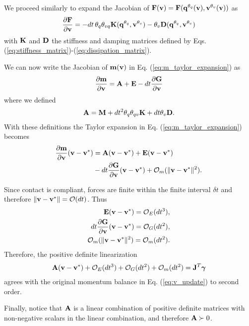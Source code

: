 We proceed similarly to expand the Jacobian of
${\mathbf{F}}({\mathbf{v}})={\mathbf{F}}({\mathbf{q}}^{\theta_{q}}({\mathbf{v}}), {\mathbf{v}}^{\theta_v}({\mathbf{v}}))$
as
\begin{align*}
	\frac{\partial{\mathbf{F}}}{\partial {\mathbf{v}}} = -dt\,\theta_q\theta_{vq}{\mathbf{K}}({\mathbf{q}}^{\theta_q},
	{\mathbf{v}}^{\theta_v})-\theta_v{\mathbf{D}}({\mathbf{q}}^{\theta_q}, {\mathbf{v}}^{\theta_v})
\end{align*}
with ${\mathbf{K}}$ and ${\mathbf{D}}$ the stiffness and damping matrices defined by Eqs.
(\ref{eq:stiffness_matrix})-(\ref{eq:dissipation_matrix}).

We can now write the Jacobian of ${\mathbf{m}}({\mathbf{v}})$ in Eq.
(\ref{eq:m_taylor_expansion}) as
\begin{align*}
	\frac{\partial {\mathbf{m}}}{\partial {\mathbf{v}}} = {\mathbf{A}} + {\mathbf{E}} - dt\frac{\partial {\mathbf{G}}}{\partial {\mathbf{v}}}
\end{align*}
where we defined
\begin{align*}
	{\mathbf{A}}={\mathbf{M}}+ dt^2\theta_q\theta_{qv}{\mathbf{K}}+dt\theta_v{\mathbf{D}}.
\end{align*}
With these definitions the Taylor expansion in Eq. (\ref{eq:m_taylor_expansion})
becomes
\begin{align*}
	\frac{\partial{\mathbf{m}}}{\partial{\mathbf{v}}}({\mathbf{v}}-{\mathbf{v}}^*) &= {\mathbf{A}}({\mathbf{v}}-{\mathbf{v}}^*) + {\mathbf{E}}({\mathbf{v}}-{\mathbf{v}}^*) \\
	&- dt\frac{\partial{\mathbf{G}}}{\partial{\mathbf{v}}}({\mathbf{v}}-{\mathbf{v}}^*) + \mathcal{O}_m(\Vert{\mathbf{v}}-{\mathbf{v}}^*\Vert^2).
\end{align*}

Since contact is compliant, forces are finite within the finite interval $\delta
t$ and therefore $\Vert{\mathbf{v}}-{\mathbf{v}}^*\Vert=\mathcal{O}(dt)$. Thus
\begin{align*}
	{\mathbf{E}}({\mathbf{v}}-{\mathbf{v}}^*)=\mathcal{O}_E(dt^3), \\
    dt\frac{\partial {\mathbf{G}}}{\partial {\mathbf{v}}}({\mathbf{v}}-{\mathbf{v}}^*)=\mathcal{O}_G(dt^2), \\ 
    \mathcal{O}_m(\Vert{\mathbf{v}}-{\mathbf{v}}^*\Vert^2) = \mathcal{O}_m(dt^2).
\end{align*}
Therefore, the positive definite linearization
\begin{align*}
	{\mathbf{A}}({\mathbf{v}}-{\mathbf{v}}^*) + \mathcal{O}_E(dt^3) + \mathcal{O}_G(dt^2) +
	\mathcal{O}_m(dt^2) = {\mathbf{J}}^T{\mathbf{{\bm\gamma}}}
\end{align*}
agrees with the original momentum balance in Eq. (\ref{eq:v_update}) to second
order.

Finally, notice that ${\mathbf{A}}$ is a linear combination of positive definite
matrices with non-negative scalars in the linear combination, and therefore
${\mathbf{A}}\succ 0$.\hfill\IEEEQED
